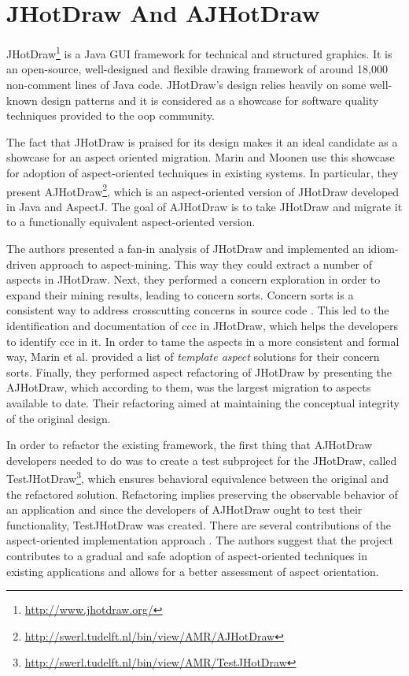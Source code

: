 \section{JHotDraw And AJHotDraw}\label{JHotDraw And AJHotDraw}
JHotDraw\footnote{\url{http://www.jhotdraw.org/}} is a Java GUI framework for technical and structured graphics. 
It is an open-source, well-designed and flexible drawing framework of around 18,000 non-comment lines of Java code. 
JHotDraw's  design relies heavily on some well-known design patterns \cite{gamma1995design} and it is considered as a showcase for software quality techniques provided to the \ac{oop} community. 

The fact that JHotDraw is praised for its design makes it an ideal candidate as a showcase for an aspect oriented migration. 
Marin and Moonen \cite{marinajhotdraw} use this showcase for adoption of aspect-oriented techniques in existing systems. 
In particular, they present AJHotDraw\footnote{\url{http://swerl.tudelft.nl/bin/view/AMR/AJHotDraw}}, which is an aspect-oriented version of JHotDraw developed in Java and AspectJ. 
The goal of AJHotDraw is to take JHotDraw and migrate it to a functionally equivalent aspect-oriented version. 

The authors presented a fan-in analysis of JHotDraw \cite{marin2004identifying} and implemented an idiom-driven approach to aspect-mining. 
This way they could extract a number of aspects in JHotDraw. 
Next, they performed a concern exploration in order to expand their mining results, leading to concern sorts.
Concern sorts is a consistent way to address crosscutting concerns in source code \cite{marin2005classification}.
This led to the identification and documentation of \ac{ccc} in JHotDraw, which helps the developers to identify \ac{ccc} in it.
In order to tame the aspects in a more consistent and formal way, Marin et al. provided a list of \textit{template aspect} solutions for their concern sorts.
Finally, they performed aspect refactoring of JHotDraw by presenting the AJHotDraw, which according to them, was the largest migration to aspects available to date.
Their refactoring aimed at maintaining the conceptual integrity of the original design.

In order to refactor the existing framework, the first thing that AJHotDraw developers needed to do was to create a test subproject for the JHotDraw, called TestJHotDraw\footnote{\url{http://swerl.tudelft.nl/bin/view/AMR/TestJHotDraw}}, which ensures behavioral equivalence between the original and the refactored solution. 
Refactoring implies preserving the observable behavior of an application \cite{fowler2009refactoring} and since the developers of AJHotDraw ought to test their functionality, TestJHotDraw was created. 
There are several contributions of the aspect-oriented implementation approach \cite{marinajhotdraw}. 
The authors suggest that the project contributes to a gradual and safe adoption of aspect-oriented techniques in existing applications and allows for a better assessment of aspect orientation.

